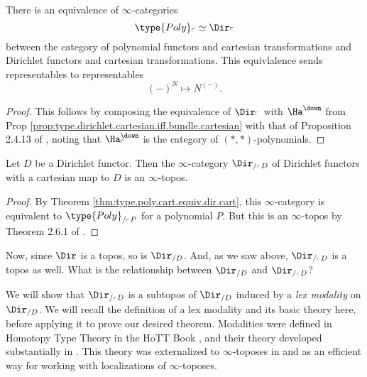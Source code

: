 \begin{thm}\label{thm:type.poly.cart.equiv.dir.cart}
  There is an equivalence of $\infty$-categories
  $$\type{Poly}_{\ulcorner} \simeq \Dir_{\ulcorner}$$
  between the category of polynomial functors and cartesian transformations and
  Dirichlet functors and cartesian transformations. This equivlalence sends
  representables to representables
  $$(-)^N \mapsto N^{(-)}.$$
\end{thm}
\begin{proof}
This follows by composing the equivalence of $\Dir_{\ulcorner}$ with
$\Ha^{\down}$ from Prop
\ref{prop:type.dirichlet.cartesian.iff.bundle.cartesian} with that of
Proposition 2.4.13 of \cite{GHK:Analytic.Monads}, noting that
$\Ha^{\down}_{\ulcorner}$ is the category of $(\ast,\ast)$-polynomials. 
\end{proof}

\begin{cor}
  Let $D$ be a Dirichlet functor. Then the $\infty$-category
  $\Dir_{/_{\ulcorner} D}$
  of Dirichlet functors with a cartesian map to $D$ is an $\infty$-topos.
\end{cor}
\begin{proof}
By Theorem \ref{thm:type.poly.cart.equiv.dir.cart}, this $\infty$-category is equivalent
to $\type{Poly}_{/_{\ulcorner} P}$ for a polynomial $P$. But this is an
$\infty$-topos by Theorem 2.6.1 of \cite{GHK:Analytic.Monads}.
\end{proof}

Now, since $\Dir$ is a topos, so is $\Dir_{/D}$. And, as we saw above,
$\Dir_{/_{\ulcorner} D}$ is a topos as well. What is the relationship between
$\Dir_{/D}$ and $\Dir_{/_{\ulcorner} D}$?

We will show that $\Dir_{/_{\ulcorner} D}$ is a subtopos of $\Dir_{/D}$ induced
by a \emph{lex modality} on $\Dir_{/D}$. We will recall the definition of a lex
modality and its basic theory here, before applying it to prove our desired
theorem. Modalities were defined in Homotopy Type Theory in the HoTT Book
\cite{UFP:HoTT.Book}, and their theory developed substantially in
\cite{RSS:Modalities.in.HoTT}. This theory was externalized to
$\infty$-toposes in \cite{ABFJ:Blakers.Massey} and \cite{ABFJ:Goodwillie} as an
efficient way for working with localizations of $\infty$-toposes.

